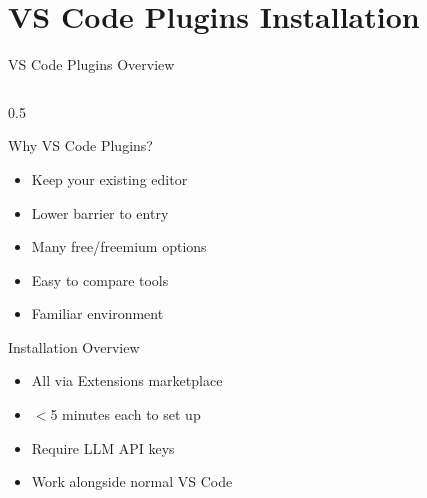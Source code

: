 \documentclass[aspectratio=169,11pt]{beamer}
\begin{document}
\section{VS Code Plugins Installation}

\begin{frame}{VS Code Plugins Overview}
    \begin{columns}[T]
        \begin{column}{0.5\textwidth}
            \begin{block}{Why VS Code Plugins?}
                \begin{itemize}
                    \item Keep your existing editor
                    \item Lower barrier to entry
                    \item Many free/freemium options
                    \item Easy to compare tools
                    \item Familiar environment
                \end{itemize}
            \end{block}

            \begin{block}{Installation Overview}
                \begin{itemize}
                    \item All via Extensions marketplace
                    \item $<$5 minutes each to set up
                    \item Require LLM API keys
                    \item Work alongside normal VS Code
                \end{itemize}
            \end{block}


\end{column}
\end{columns}
\end{frame}
\end{document}
